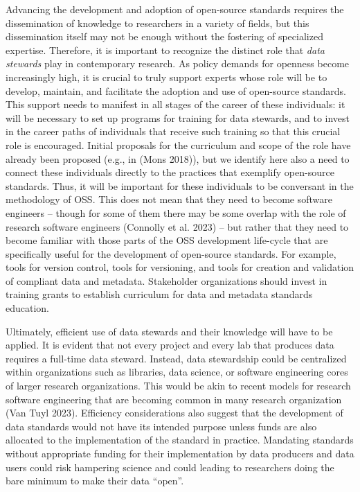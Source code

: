 \documentclass[
  letterpaper,
  DIV=11,
  numbers=noendperiod]{scrartcl}
\begin{document}
Advancing the development and adoption of open-source standards requires
the dissemination of knowledge to researchers in a variety of fields,
but this dissemination itself may not be enough without the fostering of
specialized expertise. Therefore, it is important to recognize the
distinct role that \emph{data stewards} play in contemporary research.
As policy demands for openness become increasingly high, it is crucial
to truly support experts whose role will be to develop, maintain, and
facilitate the adoption and use of open-source standards. This support
needs to manifest in all stages of the career of these individuals: it
will be necessary to set up programs for training for data stewards, and
to invest in the career paths of individuals that receive such training
so that this crucial role is encouraged. Initial proposals for the
curriculum and scope of the role have already been proposed (e.g., in
(Mons 2018)), but we identify here also a need to connect these
individuals directly to the practices that exemplify open-source
standards. Thus, it will be important for these individuals to be
conversant in the methodology of OSS. This does not mean that they need
to become software engineers -- though for some of them there may be
some overlap with the role of research software engineers (Connolly et
al. 2023) -- but rather that they need to become familiar with those
parts of the OSS development life-cycle that are specifically useful for
the development of open-source standards. For example, tools for version
control, tools for versioning, and tools for creation and validation of
compliant data and metadata. Stakeholder organizations should invest in
training grants to establish curriculum for data and metadata standards
education.

Ultimately, efficient use of data stewards and their knowledge will have
to be applied. It is evident that not every project and every lab that
produces data requires a full-time data steward. Instead, data
stewardship could be centralized within organizations such as libraries,
data science, or software engineering cores of larger research
organizations. This would be akin to recent models for research software
engineering that are becoming common in many research organization (Van
Tuyl 2023). Efficiency considerations also suggest that the development
of data standards would not have its intended purpose unless funds are
also allocated to the implementation of the standard in practice.
Mandating standards without appropriate funding for their implementation
by data producers and data users could risk hampering science and could
leading to researchers doing the bare minimum to make their data
``open''.
\end{document}
